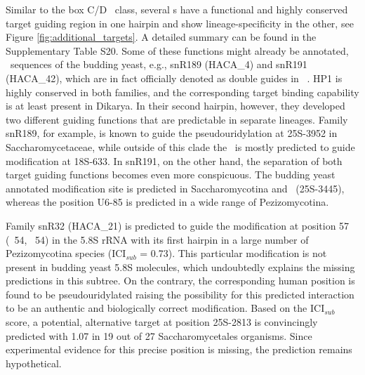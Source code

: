 Similar to the box C/D \sno\ class, several \haca s have a functional and
highly conserved target guiding region in one hairpin and show
lineage-specificity in the other, see Figure \ref{fig:additional_targets}.
A detailed summary can be found in the Supplementary Table S20. Some of
these functions might already be annotated,  \sno\
sequences of the budding yeast, e.g., snR189 (HACA\_4) and snR191
(HACA\_42), which are in fact officially denoted as double guides in \sce\
\cite{Badis:2003, Schattner:2004}.  HP1 is highly conserved in both
families, and the corresponding target binding capability is at least
present in Dikarya. In their second hairpin, however, they developed two
different guiding functions that are predictable in separate
lineages. Family snR189, for example, is known to guide the
pseudouridylation at 25S-3952 in Saccharomycetaceae, while outside of this
clade the \sno\ is mostly predicted to guide modification at 18S-633. In
snR191, on the other hand, the separation of both target guiding functions
becomes even more conspicuous. The budding yeast annotated modification
site is predicted in Saccharomycotina and \Tde\ (25S-3445), whereas the
position U6-85 is predicted in a wide range of Pezizomycotina.

Family snR32 (HACA\_21) is predicted to guide the modification at position
57 (\ncr\ 54, \sce\ 54) in the 5.8S rRNA with its first hairpin in a large
number of Pezizomycotina species (ICI$_{sub}$ = 0.73). This particular
modification is not present in budding yeast 5.8S molecules, which
undoubtedly explains the missing predictions in this subtree. On the
contrary, the corresponding human position is found to be pseudouridylated
raising the possibility for this predicted interaction to be an authentic
and biologically correct modification.  Based on the ICI$_{sub}$ score, a
potential, alternative target at position 25S-2813 is convincingly
predicted with 1.07 in 19 out of 27 Saccharomycetales organisms. Since
experimental evidence for this precise position is missing, the prediction
remains hypothetical.

